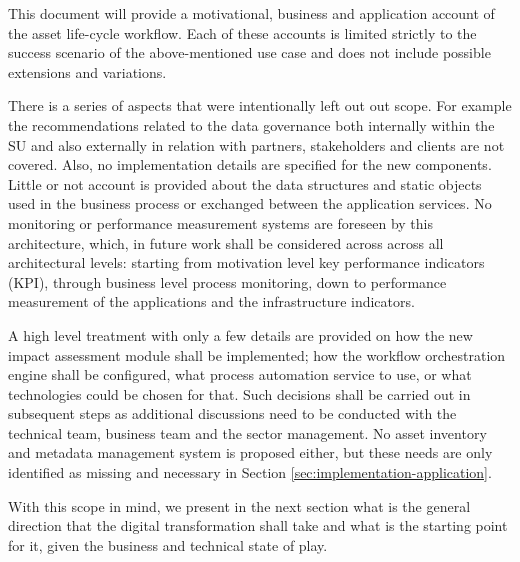 	This document will provide a motivational, business and application account of the asset life-cycle workflow. Each of these accounts is limited strictly to the success scenario of the above-mentioned use case and does not include possible extensions and variations.	
	
	There is a series of aspects that were intentionally left out out scope. For example the recommendations related to the data governance both internally within the SU and also externally in relation with partners, stakeholders and clients are not covered. Also, no implementation details are specified for the new components. Little or not account is provided about the data structures and static objects used in the business process or exchanged between the application services. No monitoring or performance measurement systems are foreseen by this architecture, which, in future work shall be considered across across all architectural levels: starting from motivation level key performance indicators (KPI), through business level process monitoring, down to performance measurement of the applications and the infrastructure indicators. 
	
	A high level treatment with only a few details are provided on how the new impact assessment module shall be implemented; how the workflow orchestration engine shall be configured, what process automation service to use, or what technologies could be chosen for that. Such decisions shall be carried out in subsequent steps as additional discussions need to be conducted with the technical team, business team and the sector management. No asset inventory and metadata management system is proposed either, but these needs are only identified as missing and necessary in Section \ref{sec:implementation-application}.
	
	With this scope in mind, we present in the next section what is the general direction that the digital transformation shall take and what is the starting point for it, given the business and technical state of play. 